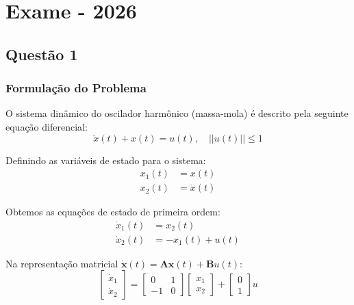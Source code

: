 \documentclass[a4paper, 12pt]{article}%
\begin{document}
\onehalfspacing

\section*{Exame - 2026}

\subsection*{Questão 1}

\subsubsection*{Formulação do Problema}

O sistema dinâmico do oscilador harmônico (massa-mola) é descrito pela seguinte equação diferencial:
\begin{equation}
    \ddot{x}(t) + x(t) = u(t), \quad || u(t) || \le 1
\end{equation}

Definindo as variáveis de estado para o sistema:
\begin{align}
    x_1(t) &= x(t) \\
    x_2(t) &= \dot{x}(t)
\end{align}

Obtemos as equações de estado de primeira ordem:
\begin{align}
    \dot{x}_1(t) &= x_2(t) \\
    \dot{x}_2(t) &= -x_1(t) + u(t)
\end{align}

Na representação matricial $\dot{\mathbf{x}}(t) = \mathbf{A}\mathbf{x}(t) + \mathbf{B}u(t)$:
\begin{equation}
    \begin{bmatrix}
        \dot{x}_1 \\
        \dot{x}_2
    \end{bmatrix}
    =
    \begin{bmatrix}
        0 & 1 \\
        -1 & 0
    \end{bmatrix}
    \begin{bmatrix}
        x_1 \\
        x_2
    \end{bmatrix}
    +
    \begin{bmatrix}
        0 \\
        1
    \end{bmatrix} u
\end{equation}
\end{document}
